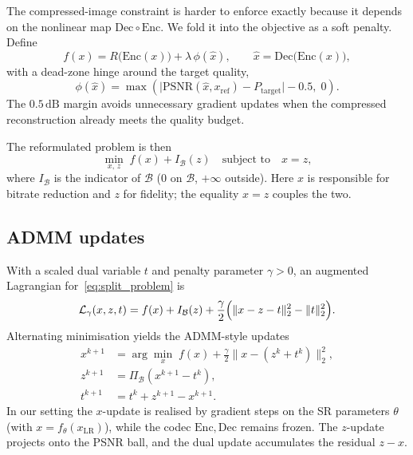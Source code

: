 The compressed-image constraint is harder to enforce exactly because it depends
on the nonlinear map \(\mathrm{Dec}\circ\mathrm{Enc}\). We fold it into the
objective as a soft penalty. Define
\begin{equation}
  f(x) = R\!\bigl(\mathrm{Enc}(x)\bigr) + \lambda\,\phi(\hat{x}),
  \qquad
  \hat{x} = \mathrm{Dec}\!\bigl(\mathrm{Enc}(x)\bigr),
\end{equation}
with a dead-zone hinge around the target quality,
\begin{equation}
  \phi(\hat{x})
  = \max\!\left(
      \bigl|\mathrm{PSNR}(\hat{x}, x_{\mathrm{ref}}) - P_{\mathrm{target}}\bigr|
      - 0.5,\; 0
    \right).
  \label{eq:soft_penalty}
\end{equation}
The \(0.5\,\mathrm{dB}\) margin avoids unnecessary gradient updates when the
compressed reconstruction already meets the quality budget.

The reformulated problem is then
\begin{equation}
  \min_{x,\,z} \; f(x) + I_{\mathcal{B}}(z)
  \quad \text{subject to} \quad x = z,
  \label{eq:split_problem}
\end{equation}
where \(I_{\mathcal{B}}\) is the indicator of \(\mathcal{B}\)
(\(0\) on \(\mathcal{B}\), \(+\infty\) outside). Here \(x\) is responsible for
bitrate reduction and \(z\) for fidelity; the equality \(x=z\) couples the two.

\subsection{ADMM updates}

With a scaled dual variable \(t\) and penalty parameter \(\gamma>0\), an
augmented Lagrangian for~\eqref{eq:split_problem} is
\begin{equation}
  \mathcal{L}_{\gamma}(x, z, t)
  = f(x) + I_{\mathcal{B}}(z)
    + \frac{\gamma}{2}
      \Bigl(\|x - z - t\|_2^2 - \|t\|_2^2\Bigr).
\end{equation}
Alternating minimisation yields the ADMM-style updates
\begin{align}
  x^{k+1}
  &= \arg\min_{x} \;
     f(x) + \tfrac{\gamma}{2}\|x - (z^{k} + t^{k})\|_2^2,
     \label{eq:x_update} \\
  z^{k+1}
  &= \Pi_{\mathcal{B}}(x^{k+1} - t^{k}),
     \label{eq:z_update} \\
  t^{k+1}
  &= t^{k} + z^{k+1} - x^{k+1}.
     \label{eq:t_update}
\end{align}
In our setting the \(x\)-update is realised by gradient steps on the SR
parameters \(\theta\) (with \(x = f_{\theta}(x_{\mathrm{LR}})\)), while the codec
\(\mathrm{Enc},\mathrm{Dec}\) remains frozen. The \(z\)-update projects onto the
PSNR ball, and the dual update accumulates the residual \(z-x\).

